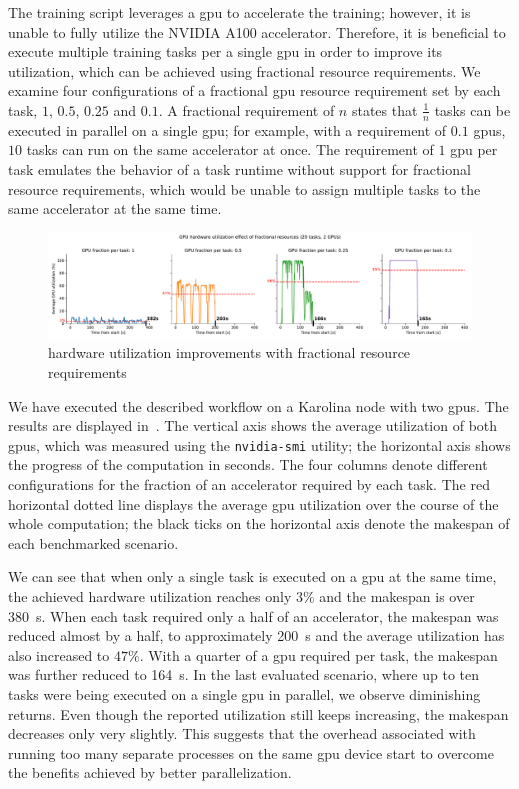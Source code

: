 The training script leverages a \gls{gpu} to accelerate the training; however, it is unable to
fully utilize the NVIDIA A100 accelerator. Therefore, it is beneficial to execute multiple
training tasks per a single \gls{gpu} in order to improve its utilization, which can be
achieved using fractional resource requirements. We examine four configurations of a fractional \gls{gpu}
resource requirement set by each task, $1$, $0.5$, $0.25$ and $0.1$.
A fractional requirement of $n$ states that $\frac{1}{n}$ tasks can be executed in parallel on a
single \gls{gpu}; for example, with a requirement of $0.1$ \glspl{gpu}, $10$ tasks can run on the
same accelerator at once. The requirement of $1$ \gls{gpu} per task emulates the behavior of a
task runtime without support for fractional resource requirements, which would be unable to
assign multiple tasks to the same accelerator at the same time.

\begin{figure}[h]
	\centering
	\includegraphics[width=\textwidth]{imgs/hq/charts/fractional-resources}
	\caption{ hardware utilization improvements with fractional resource requirements}
	\label{fig:hq-fractional-resources}
\end{figure}

We have executed the described workflow on a Karolina node with two \glspl{gpu}. The results are
displayed in~. The vertical axis shows the average
utilization of both \glspl{gpu}, which was measured using the \texttt{nvidia-smi} utility; the
horizontal axis shows the progress of the computation in seconds. The four columns denote different configurations for the fraction of an accelerator
required by each task. The red horizontal dotted line displays the average \gls{gpu} utilization
over the course of the whole computation; the black ticks on the horizontal axis denote the makespan
of each benchmarked scenario.

We can see that when only a single task is executed on a \gls{gpu} at the same time, the
achieved hardware utilization reaches only $3\%$ and the makespan is over \SI{380}{\second}.
When each task required only a half of an accelerator, the makespan was reduced almost
by a half, to approximately \SI{200}{\second} and the average utilization has also increased to
$47\%$. With a quarter of a \gls{gpu} required per task, the makespan was further reduced to
\SI{164}{\second}. In the last evaluated scenario, where up to ten tasks were being executed on a
single \gls{gpu} in parallel, we observe diminishing returns. Even though the reported
utilization still keeps increasing, the makespan decreases only very slightly. This suggests
that the overhead associated with running too many separate processes on the same \gls{gpu} device
start to overcome the benefits achieved by better parallelization.

